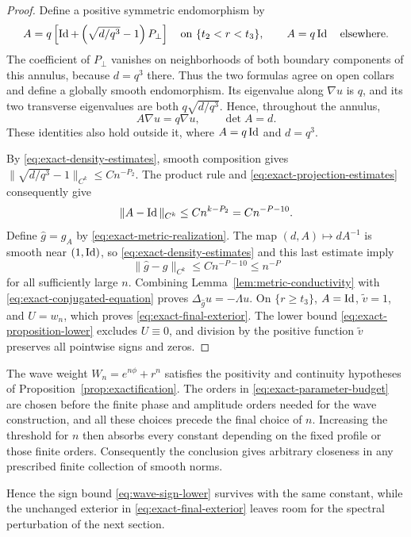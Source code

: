 \begin{proof}
Define a positive symmetric endomorphism by
\begin{equation}
 A=q\left[\operatorname{Id}+\left(\sqrt{d/q^3}-1\right)P_\perp\right]
 \quad\hbox{on }\{t_2<r<t_3\},\qquad
 A=q\operatorname{Id}\quad\hbox{elsewhere}.
 \label{eq:exact-annular-conductivity}
\end{equation}
The coefficient of \(P_\perp\) vanishes on neighborhoods of both
boundary components of this annulus, because \(d=q^3\) there.
Thus the two formulas agree on open collars and define a globally
smooth endomorphism.  Its eigenvalue along \(\nabla u\) is \(q\),
and its two transverse eigenvalues are both
\(q\sqrt{d/q^3}\).  Hence, throughout the annulus,
\[
 A\nabla u=q\nabla u,\qquad \det A=d.
\]
These identities also hold outside it, where \(A=q\operatorname{Id}\) and
\(d=q^3\).

By \eqref{eq:exact-density-estimates}, smooth composition gives
\(\|\sqrt{d/q^3}-1\|_{C^k}\le Cn^{-P_2}\).
The product rule and \eqref{eq:exact-projection-estimates} consequently
give
\[
 \|A-\operatorname{Id}\|_{C^k}\le Cn^{k-P_2}=Cn^{-P-10}.
\]
Define \(\widehat g=g_A\) by
\eqref{eq:exact-metric-realization}.  The map
\((d,A)\mapsto dA^{-1}\) is smooth near \((1,\operatorname{Id})\), so
\eqref{eq:exact-density-estimates} and this last estimate imply
\[
 \|\widehat g-g\|_{C^k}\le Cn^{-P-10}\le n^{-P}
\]
for all sufficiently large \(n\).  Combining
Lemma~\ref{lem:metric-conductivity} with
\eqref{eq:exact-conjugated-equation} proves
\(\Delta_{\widehat g}u=-\Lambda u\).  On \(\{r\ge t_3\}\),
\(A=\operatorname{Id}\), \(\widetilde v=1\), and \(U=w_n\), which proves
\eqref{eq:exact-final-exterior}.  The lower bound
\eqref{eq:exact-proposition-lower} excludes \(U\equiv0\), and
division by the positive function \(\widetilde v\) preserves all
pointwise signs and zeros.
\end{proof}

\begin{remark}
The wave weight \(W_n=e^{n\phi}+r^n\) satisfies the
positivity and continuity hypotheses of Proposition~\ref{prop:exactification}.
The orders in \eqref{eq:exact-parameter-budget} are chosen before the
finite phase and amplitude orders needed for the wave construction,
and all these choices precede the final choice of \(n\).  Increasing
the threshold for \(n\) then absorbs every constant depending on the
fixed profile or those finite orders.  Consequently the conclusion
gives arbitrary closeness in any prescribed finite collection of
smooth norms.

Hence the sign bound \eqref{eq:wave-sign-lower} survives with the same
constant, while the unchanged exterior in
\eqref{eq:exact-final-exterior} leaves room for the spectral
perturbation of the next section.
\end{remark}

